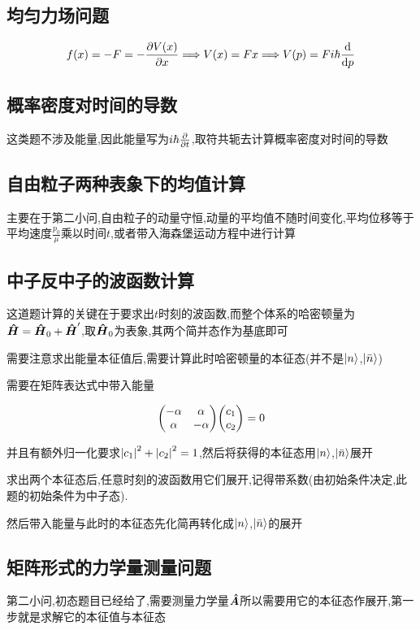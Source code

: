 \documentclass{article}
\begin{document}
        \subsection{均匀力场问题}
            $$ f(x) = -F = - \pdv{V(x)}{x} \Longrightarrow V(x) = F x \Longrightarrow V(p) = Fi\hbar \dv{p}$$

        \subsection{概率密度对时间的导数}
            这类题不涉及能量,因此能量写为$i\hbar \pdv{t}$,取符共轭去计算概率密度对时间的导数

        \subsection{自由粒子两种表象下的均值计算}
            主要在于第二小问,自由粒子的动量守恒,动量的平均值不随时间变化,平均位移等于平均速度$\frac{p_{0}}{\mu}$乘以时间$t$,或者带入海森堡运动方程中进行计算
        
        \subsection{中子反中子的波函数计算}
            这道题计算的关键在于要求出$t$时刻的波函数,而整个体系的哈密顿量为$\vu*{H} = \vu*{H}_{0} + \vu*{H}'$,取$\vu*{H}_{0}$为表象,其两个简并态作为基底即可

            需要注意求出能量本征值后,需要计算此时哈密顿量的本征态(并不是$\ket{n}$,$\ket{\bar{n}}$)

            需要在矩阵表达式中带入能量 
            
            $$ \mqty(-\alpha & \alpha \\ \alpha & -\alpha) \mqty(c_{1} \\ c_{2}) = 0 $$

            并且有额外归一化要求$ \abs{c_{1}}^{2} + \abs{c_{2}}^{2} = 1 $,然后将获得的本征态用$\ket{n}$,$\ket{\bar{n}}$展开
            
            求出两个本征态后,任意时刻的波函数用它们展开,记得带系数(由初始条件决定,此题的初始条件为中子态).

            然后带入能量与此时的本征态先化简再转化成$\ket{n}$,$\ket{\bar{n}}$的展开

        \subsection{矩阵形式的力学量测量问题}
            第二小问,初态题目已经给了,需要测量力学量$\vu*{A}$所以需要用它的本征态作展开,第一步就是求解它的本征值与本征态
\end{document}
